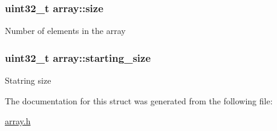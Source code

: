 \subsubsection[{size}]{\setlength{\rightskip}{0pt plus 5cm}uint32\+\_\+t array\+::size}\label{structarray_a5f368728114c0d6f950988fdfd1492d1}
Number of elements in the array \hypertarget{structarray_a6b0cfff527d88be657ec0a21363ddd75}{}
\subsubsection[{starting\+\_\+size}]{\setlength{\rightskip}{0pt plus 5cm}uint32\+\_\+t array\+::starting\+\_\+size}\label{structarray_a6b0cfff527d88be657ec0a21363ddd75}
Statring size 

The documentation for this struct was generated from the following file\+:\begin{DoxyCompactItemize}
\item 
\hyperlink{array_8h}{array.\+h}\end{DoxyCompactItemize}
